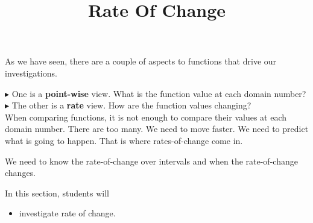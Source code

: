 \documentclass{ximera}
\title{Rate Of Change}
\begin{document}
\begin{abstract}
\end{abstract}
\maketitle







As we have seen, there are a couple of aspects to functions that drive our investigations.

$\blacktriangleright$ One is a \textbf{point-wise} view.  What is the function value at each domain number? \\


$\blacktriangleright$ The other is a \textbf{rate} view.  How are the function values changing? \\



When comparing functions, it is not enough to compare their values at each domain number.  There are too many.  We need to move faster.  We need to predict what is going to happen. That is where rates-of-change come in.




We need to know the rate-of-change over intervals and when the rate-of-change changes.




















\begin{sectionOutcomes}
In this section, students will 

\begin{itemize}
\item investigate rate of change.

\end{itemize}
\end{sectionOutcomes}
\end{document}
